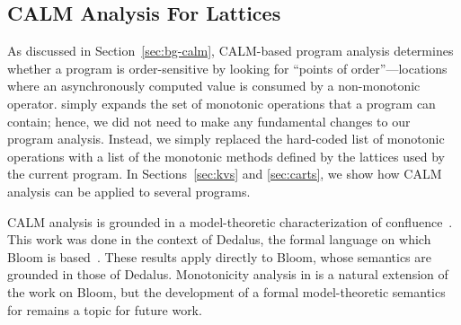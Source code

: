 

\subsection{CALM Analysis For Lattices}
\label{sec:calmL}

As discussed in Section~\ref{sec:bg-calm}, CALM-based program analysis
determines whether a program is order-sensitive by looking for ``points of
order''---locations where an asynchronously computed value is consumed by a
non-monotonic operator. \lang simply expands the set of monotonic operations
that a program can contain; hence, we did not need to make any fundamental
changes to our program analysis. Instead, we simply replaced the hard-coded list
of monotonic operations with a list of the monotonic methods defined by the
lattices used by the current program. In Sections~\ref{sec:kvs} and
\ref{sec:carts}, we show how CALM analysis can be applied to several \lang programs.

CALM analysis is grounded in a model-theoretic characterization of
confluence~\cite{dedalus-confluence}. This work was done in the context of
Dedalus, the formal language on which Bloom is based~\cite{dedalus}.  These
results apply directly to Bloom, whose semantics are grounded in those of
Dedalus. Monotonicity analysis in \lang is a natural extension of the work on
Bloom, but the development of a formal model-theoretic semantics for \lang
remains a topic for future work.

